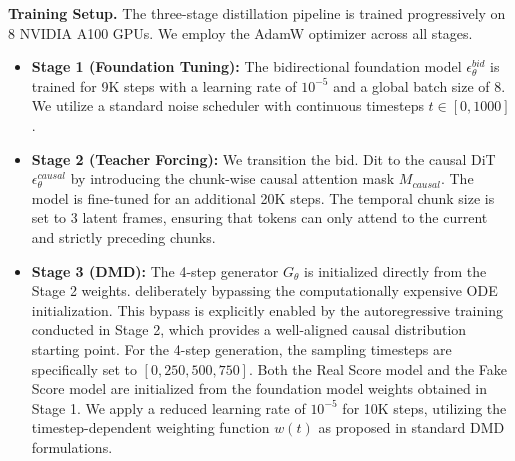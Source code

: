 \noindent \textbf{Training Setup.} The three-stage distillation pipeline is trained progressively on 8 NVIDIA A100 GPUs. We employ the AdamW optimizer across all stages. 
\begin{itemize}
    \item \textbf{Stage 1 (Foundation Tuning):} The bidirectional foundation model $\epsilon_{\theta}^{bid}$ is trained for 9K steps with a learning rate of $10^{-5}$ and a global batch size of 8. We utilize a standard noise scheduler with continuous timesteps $t \in [0, 1000]$.
    \item \textbf{Stage 2 (Teacher Forcing):} We transition the bid. Dit to the causal DiT $\epsilon_{\theta}^{causal}$ by introducing the chunk-wise causal attention mask $M_{causal}$. The model is fine-tuned for an additional 20K steps. The temporal chunk size is set to 3 latent frames, ensuring that tokens can only attend to the current and strictly preceding chunks.
    \item \textbf{Stage 3 (DMD):} The 4-step generator $G_{\theta}$ is initialized directly from the Stage 2 weights. deliberately bypassing the computationally expensive ODE initialization. This bypass is explicitly enabled by the autoregressive training conducted in Stage 2, which provides a well-aligned causal distribution starting point. For the 4-step generation, the sampling timesteps are specifically set to $[0, 250, 500, 750]$. Both the Real Score model and the Fake Score model are initialized from the foundation model weights obtained in Stage 1. We apply a reduced learning rate of $10^{-5}$ for 10K steps, utilizing the timestep-dependent weighting function $w(t)$ as proposed in standard DMD formulations.

\end{itemize}



